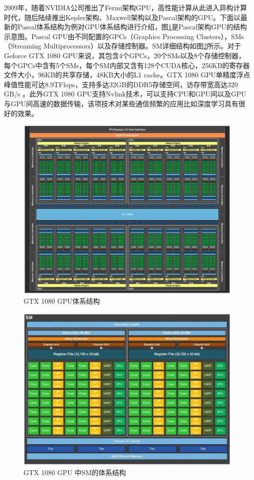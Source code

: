       2009年，随着NVIDIA公司推出了Fermi架构GPU，高性能计算从此进入异构计算时代，随后陆续推出Kepler架构、Maxwell架构以及Pascal架构的GPU。下面以最新的Pascal体系结构为例对GPU体系结构进行介绍，图\ref{fig:pascal1080}是Pascal架构GPU的结构示意图。Pascal GPU由不同配置的GPCs（Graphics Processing Clusters），SMs（Streaming Multiprocessors）以及存储控制器。SM详细结构如图\ref{fig:pascalsm}所示。对于Geforce GTX 1080 GPU来说，其包含4个GPCs，20个SMs以及8个存储控制器，每个GPCs中含有5个SMs，每个SM内部又含有128个CUDA核心，256KB的寄存器文件大小，96KB的共享存储，48KB大小的L1 cache。GTX 1080 GPU单精度浮点峰值性能可达8.9TFlops，支持多达32GB的DDR5存储空间，访存带宽高达320 GB/s 。此外GTX 1080 GPU支持Nvlink技术，可以支持CPU和GPU间以及GPU与GPU间高速的数据传输，该项技术对某些通信频繁的应用比如深度学习具有很好的效果。
       \begin{figure}[ht!]
	\centering
	\includegraphics[width=0.9\linewidth]{figs/pascal_gp104_block_diagram.png}
	\caption{GTX 1080 GPU体系结构}
	\label{fig:pascal1080}
	\end{figure}
	
	\begin{figure}[ht!]
	\centering
	\includegraphics[width=0.9\linewidth]{figs/pascalgpu.jpeg}
	\caption{GTX 1080 GPU 中SM的体系结构}
	\label{fig:pascalsm}
	\end{figure}
             
